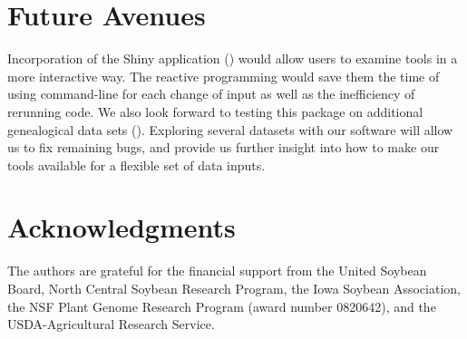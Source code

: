\documentclass[article,shortnames]{jss}
\begin{document}
\section{Future Avenues}

Incorporation of the Shiny application (\citealt{shiny}) would allow users to examine  tools in a more interactive way. The reactive programming would save them the time of using command-line for each change of input as well as the inefficiency of rerunning code. We also look forward to testing this package on additional genealogical data sets (\citealt{mgp}). Exploring several datasets with our software will allow us to fix remaining bugs, and provide us further insight into how to make our tools available for a flexible set of data inputs.


\section*{Acknowledgments} %

The authors are grateful for the financial support from the United Soybean Board, North Central Soybean Research Program, the Iowa Soybean Association, the NSF Plant Genome Research Program (award number 0820642), and the USDA-Agricultural Research Service.


\end{document}
